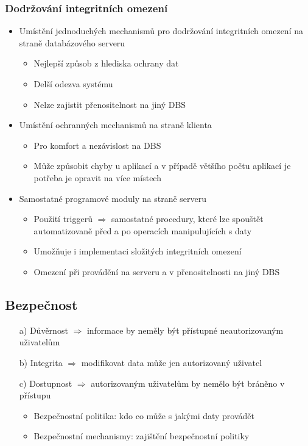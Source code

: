 \documentclass[a4paper,10pt]{article}
\newcommand{\tedy}{$\Rightarrow$ }
\begin{document}
			\subsubsection{Dodržování integritních omezení}
				\begin{itemize}
					\item Umístění jednoduchých mechanismů pro dodržování integritních omezení na straně databázového serveru
					\begin{itemize}
						\item Nejlepší způsob z hlediska ochrany dat
						\item Delší odezva systému
						\item Nelze zajistit přenositelnost na jiný DBS
					\end{itemize}
					\item Umístění ochranných mechanismů na straně klienta
					\begin{itemize}
						\item Pro komfort a nezávislost na DBS
						\item Může způsobit chyby u aplikací a v případě většího počtu aplikací je potřeba je opravit na více místech
					\end{itemize}
					\item Samostatné programové moduly na straně serveru
					\begin{itemize}
						\item Použití triggerů \tedy samostatné procedury, které lze spouštět automatizovaně před a po operacích manipulujících s daty
						\item Umožňuje i implementaci složitých integritních omezení
						\item Omezení při provádění na serveru a v přenositelnosti na jiný DBS
					\end{itemize}
				\end{itemize}

		\subsection{Bezpečnost}
			\begin{itemize}
				\item[a)] Důvěrnost \tedy informace by neměly být přístupné neautorizovaným uživatelům
				\item[b)] Integrita \tedy modifikovat data může jen autorizovaný uživatel
				\item[c)] Dostupnost \tedy autorizovaným uživatelům by nemělo být bráněno v přístupu
				\begin{itemize}
					\item Bezpečnostní politika: kdo co může s jakými daty provádět
					\item Bezpečnostní mechanismy: zajištění bezpečnostní politiky
				\end{itemize}	
			\end{itemize}
\end{document}
